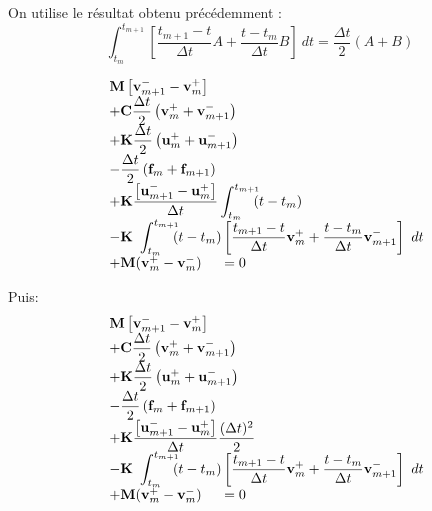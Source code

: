 \documentclass[12pt,a4paper]{report}
\begin{document}
On utilise le résultat obtenu précédemment :
\begin{equation}
\int_{t_m}^{t_{m+1}} \!\!\! 	
	\left[
		\frac{t_{m+1}-t}{\Delta t} A + 
		\frac{t-t_m}{\Delta t} B 
	\right] ~dt
= \frac{\Delta t}{2} (A+B)
\end{equation}

\begin{equation}
\begin{array}{r l}
	&\displaystyle
	 \mathbf{M}
	    	\left[ \mathbf{v}_{m+1}^- 
	    		- \mathbf{v}_m^+ \right]
	\\ 
	  &\displaystyle
	  +\mathbf{C} \frac{\Delta t}{2}
		\left(
			\mathbf{v}_m^+ + 
			\mathbf{v}_{m+1}^- 
		\right)
	\\
	  &\displaystyle
	 +\mathbf{K} \frac{\Delta t}{2}
		\left(
			\mathbf{u}_m^+ + 
			\mathbf{u}_{m+1}^- 
		\right)
	\\
	  &\displaystyle
	   -\frac{\Delta t}{2}
		\left(
			\mathbf{f}_m + 
			\mathbf{f}_{m+1}
		\right) 
	\\
	  &+\displaystyle
	    \mathbf{K}
	    	\frac{\left[ \mathbf{u}_{m+1}^- 
	    		- \mathbf{u}_m^+ \right]    }{\Delta t}			
			\int_{t_m}^{t_{m+1}} \!\!\! (t-t_m) 
	\\
	  &\displaystyle	    
	    -\mathbf{K}~\int_{t_m}^{t_{m+1}} \!\!\! 	
		(t-t_m) \left[
			\frac{t_{m+1}-t}{\Delta t} \mathbf{v}_m^+ + 
			\frac{t-t_m}{\Delta t} \mathbf{v}_{m+1}^- 
			\right] ~dt
	\\
	  &+  \mathbf{M}(\mathbf{v}_m^+ - \mathbf{v}_m^-)
	~~~~=0	
\end{array}
\end{equation}

Puis:
\begin{equation}
\begin{array}{r l}
	&\displaystyle
	 \mathbf{M}
	    	\left[ \mathbf{v}_{m+1}^- 
	    		- \mathbf{v}_m^+ \right]
	\\ 
	  &\displaystyle
	  +\mathbf{C} \frac{\Delta t}{2}
		\left(
			\mathbf{v}_m^+ + 
			\mathbf{v}_{m+1}^- 
		\right)
	\\
	  &\displaystyle
	 +\mathbf{K} \frac{\Delta t}{2}
		\left(
			\mathbf{u}_m^+ + 
			\mathbf{u}_{m+1}^- 
		\right)
	\\
	  &\displaystyle
	   -\frac{\Delta t}{2}
		\left(
			\mathbf{f}_m + 
			\mathbf{f}_{m+1}
		\right)
	\\
	  &+\displaystyle
	    \mathbf{K}
	    	\frac{\left[ \mathbf{u}_{m+1}^- 
	    		- \mathbf{u}_m^+ \right]    }{\Delta t}		
			\frac{(\Delta t)^2}{2}
	\\
	  &\displaystyle	    
	    -\mathbf{K}~\int_{t_m}^{t_{m+1}} \!\!\! 	
		(t-t_m) \left[
			\frac{t_{m+1}-t}{\Delta t} \mathbf{v}_m^+ + 
			\frac{t-t_m}{\Delta t} \mathbf{v}_{m+1}^- 
			\right] ~dt
	\\
	  &+  \mathbf{M}(\mathbf{v}_m^+ - \mathbf{v}_m^-)
	~~~~=0	
\end{array}
\end{equation}
\end{document}
